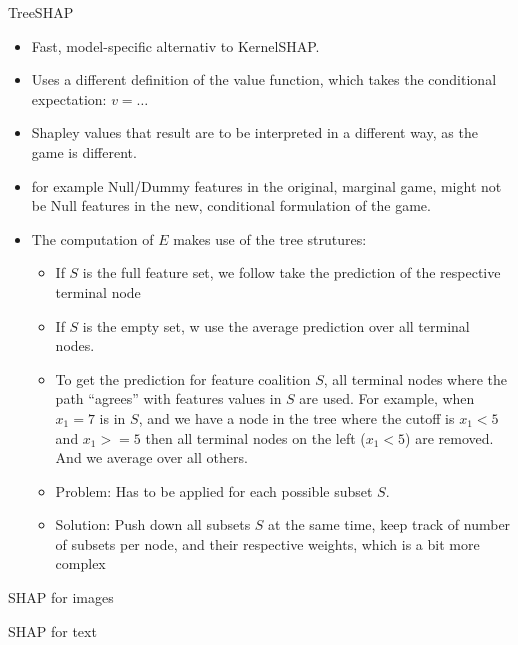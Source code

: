 \documentclass[10pt,compress,t,notes=noshow, xcolor=table]{beamer}
\begin{document}
\begin{vbframe}{TreeSHAP}

  \begin{itemize}
    \item Fast, model-specific alternativ to KernelSHAP.
    \item Uses a different definition of the value function, which takes the conditional expectation: $v = \ldots $
    \item Shapley values that result are to be interpreted in a different way, as the game is different.
    \item for example Null/Dummy features in the original, marginal game, might not be Null features in the new, conditional formulation of the game.


  \framebreak
    \item The computation of $E$ makes use of the tree strutures:
      \begin{itemize}
        \item If $S$ is the full feature set, we follow take the prediction of the respective terminal node
        \item If $S$ is the empty set, w use the average prediction over all terminal nodes.
        \item To get the prediction for feature coalition $S$, all terminal nodes where the path \enquote{agrees} with features values in $S$ are used. For example, when $x_1 = 7$ is in $S$, and we have a node in the tree where the cutoff is $x_1 < 5$ and $x_1 >= 5$ then all terminal nodes on the left ($x_1 < 5$) are removed. And we average over all others.
        \item Problem: Has to be applied for each possible subset $S$.
        \item Solution: Push down all subsets $S$ at the same time, keep track of number of subsets per node, and their respective weights, which is a bit more complex 
      \end{itemize}

  \end{itemize}

\end{vbframe}


\begin{vbframe}{SHAP for images}
\end{vbframe}


\begin{vbframe}{SHAP for text}
\end{vbframe}

\endlecture
\end{document}
